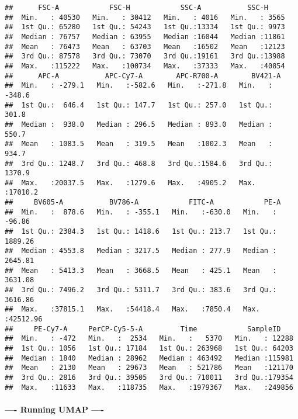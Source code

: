 \documentclass[
]{article}
\newenvironment{Shaded}{\begin{snugshade}}{\end{snugshade}}
\newcommand{\CommentTok}[1]{\textcolor[rgb]{0.56,0.35,0.01}{\textit{#1}}}
\newcommand{\ControlFlowTok}[1]{\textcolor[rgb]{0.13,0.29,0.53}{\textbf{#1}}}
\newcommand{\FunctionTok}[1]{\textcolor[rgb]{0.13,0.29,0.53}{\textbf{#1}}}
\newcommand{\NormalTok}[1]{#1}
\newcommand{\OtherTok}[1]{\textcolor[rgb]{0.56,0.35,0.01}{#1}}
\newcommand{\SpecialCharTok}[1]{\textcolor[rgb]{0.81,0.36,0.00}{\textbf{#1}}}
\begin{document}
\begin{verbatim}
##      FSC-A            FSC-H            SSC-A           SSC-H      
##  Min.   : 40530   Min.   : 30412   Min.   : 4016   Min.   : 3565  
##  1st Qu.: 65280   1st Qu.: 54243   1st Qu.:13334   1st Qu.: 9973  
##  Median : 76757   Median : 63955   Median :16044   Median :11861  
##  Mean   : 76473   Mean   : 63703   Mean   :16502   Mean   :12123  
##  3rd Qu.: 87578   3rd Qu.: 73070   3rd Qu.:19161   3rd Qu.:13988  
##  Max.   :115222   Max.   :100734   Max.   :37333   Max.   :40854  
##      APC-A           APC-Cy7-A        APC-R700-A        BV421-A       
##  Min.   : -279.1   Min.   :-582.6   Min.   :-271.8   Min.   : -348.6  
##  1st Qu.:  646.4   1st Qu.: 147.7   1st Qu.: 257.0   1st Qu.:  301.8  
##  Median :  938.0   Median : 296.5   Median : 893.0   Median :  550.7  
##  Mean   : 1083.5   Mean   : 319.5   Mean   :1002.3   Mean   :  934.7  
##  3rd Qu.: 1248.7   3rd Qu.: 468.8   3rd Qu.:1584.6   3rd Qu.: 1370.9  
##  Max.   :20037.5   Max.   :1279.6   Max.   :4905.2   Max.   :17010.2  
##     BV605-A           BV786-A            FITC-A            PE-A         
##  Min.   :  878.6   Min.   : -355.1   Min.   :-630.0   Min.   :  -96.86  
##  1st Qu.: 2384.3   1st Qu.: 1418.6   1st Qu.: 213.7   1st Qu.: 1889.26  
##  Median : 4553.8   Median : 3217.5   Median : 277.9   Median : 2645.81  
##  Mean   : 5413.3   Mean   : 3668.5   Mean   : 425.1   Mean   : 3631.08  
##  3rd Qu.: 7496.2   3rd Qu.: 5311.7   3rd Qu.: 383.6   3rd Qu.: 3616.86  
##  Max.   :37815.1   Max.   :54418.4   Max.   :7850.4   Max.   :42512.96  
##     PE-Cy7-A     PerCP-Cy5-5-A         Time            SampleID     
##  Min.   : -472   Min.   :  2534   Min.   :   5370   Min.   : 12288  
##  1st Qu.: 1056   1st Qu.: 17184   1st Qu.: 263968   1st Qu.: 64203  
##  Median : 1840   Median : 28962   Median : 463492   Median :115981  
##  Mean   : 2130   Mean   : 29673   Mean   : 521786   Mean   :121170  
##  3rd Qu.: 2816   3rd Qu.: 39505   3rd Qu.: 710011   3rd Qu.:179354  
##  Max.   :11633   Max.   :118735   Max.   :1979367   Max.   :249856
\end{verbatim}

\hypertarget{running-umap--}{%
\paragraph{---- Running UMAP ----}\label{running-umap--}}

\begin{Shaded}
\end{Shaded}
\end{document}
